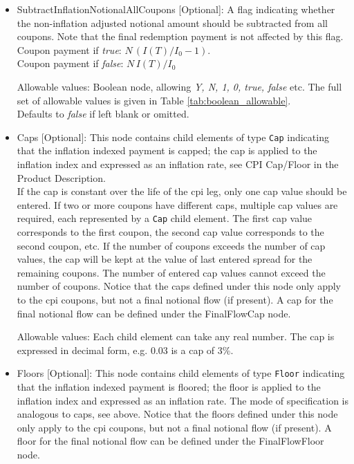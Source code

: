 \begin{itemize}
\item SubtractInflationNotionalAllCoupons [Optional]: A flag indicating whether
  the non-inflation adjusted notional amount should be subtracted from
  all coupons.
  Note that the final redemption payment is not affected by this flag. \\
Coupon payment if \emph{true}: $N \,(I(T)/I_0-1)$. \\
Coupon payment if  \emph{false}: $N \,I(T)/I_0$

Allowable values: Boolean node, allowing \emph{Y, N, 1, 0, true, false} etc. The full set of allowable values is given in Table \ref{tab:boolean_allowable}.
\\Defaults to \emph{false}  if left blank or omitted.

\item Caps [Optional]: This node contains child elements of type
  \lstinline!Cap! indicating that the inflation indexed payment is
  capped; the cap is applied to the inflation index and expressed as
  an inflation rate, see CPI Cap/Floor in the Product Description. \\
  If the cap is constant over the life of the
cpi leg, only one cap value should
be entered. If two or more coupons have different caps, multiple cap values
are required, each represented by a \lstinline!Cap! child element. The first cap value
corresponds to the first coupon, the second cap value corresponds to the
second coupon, etc. If the number of coupons exceeds the number of cap
values, the cap will be kept at the value of last entered spread for the
remaining coupons. The number of entered cap values cannot exceed the
number of coupons. Notice that the caps defined under this node only apply to the cpi coupons,
but not a final notional flow (if present). A cap for the final notional flow can be defined
under the FinalFlowCap node.

Allowable values: Each child element can take any real number. The cap is
expressed in decimal form, e.g. 0.03 is a cap of 3\%.

\item Floors [Optional]: This node contains child elements of type
  \lstinline!Floor! indicating that the inflation indexed payment is
  floored; the floor is applied to the inflation index and expressed as
  an inflation rate. The mode of specification is analogous to caps, see
  above. Notice that the floors defined under this node only apply to the cpi coupons,
  but not a final notional flow (if present). A floor for the final notional flow can be defined
  under the FinalFlowFloor node.


\end{itemize}
